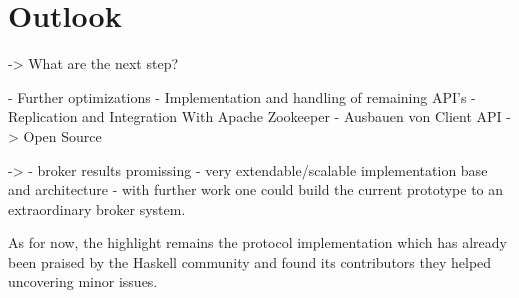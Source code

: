 

\section{Outlook}
-> What are the next step? 

- Further optimizations 
- Implementation and handling of remaining API's 
- Replication and Integration With Apache Zookeeper 
- Ausbauen von Client API 
-> Open Source 

-> 
- broker results promissing
- very extendable/scalable implementation base and architecture
- with further work one could build the current prototype to an extraordinary
broker system.

As for now, the highlight remains the protocol implementation which has already
been praised by the Haskell community and found its contributors they helped
uncovering minor issues.


